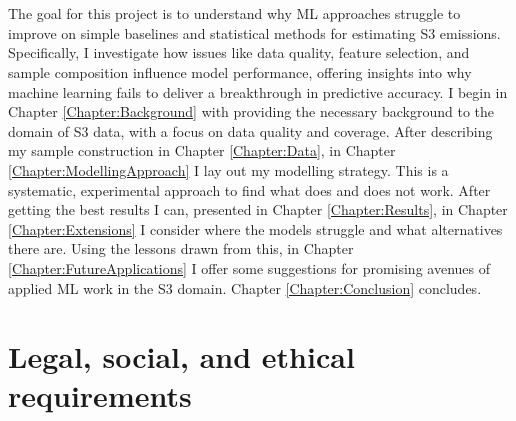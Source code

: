 \documentclass[12pt,twoside]{report}
\begin{document}
\\\\
The goal for this project is to understand why ML approaches struggle to improve on simple baselines and statistical methods for estimating S3 emissions. Specifically, I investigate how issues like data quality, feature selection, and sample composition influence model performance, offering insights into why machine learning fails to deliver a breakthrough in predictive accuracy. I begin in Chapter \ref{Chapter:Background} with providing the necessary background to the domain of S3 data, with a focus on data quality and coverage. After describing my sample construction in Chapter \ref{Chapter:Data}, in Chapter \ref{Chapter:ModellingApproach} I lay out my modelling strategy. This is a systematic, experimental approach to find what does and does not work. After getting the best results I can, presented in Chapter \ref{Chapter:Results}, in Chapter \ref{Chapter:Extensions} I consider where the models struggle and what alternatives there are. Using the lessons drawn from this, in Chapter \ref{Chapter:FutureApplications} I offer some suggestions for promising avenues of applied ML work in the S3 domain. Chapter \ref{Chapter:Conclusion} concludes. 

\section{Legal, social, and ethical requirements}
\end{document}
